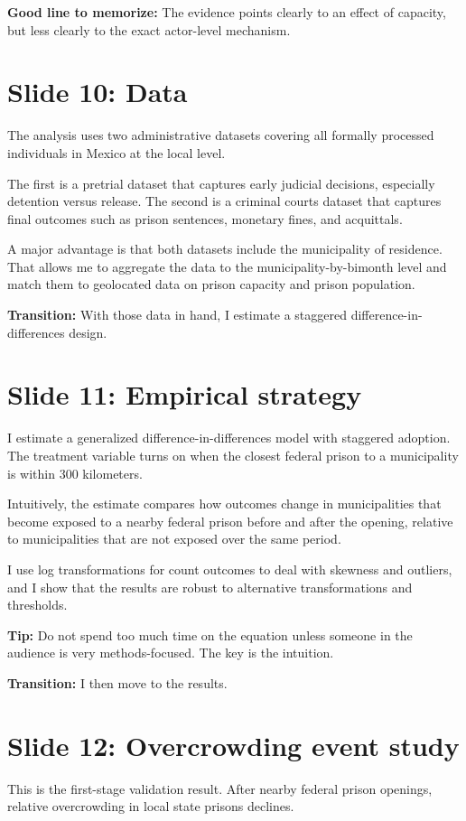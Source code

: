 \documentclass[11pt]{article}
\begin{document}
\textbf{Good line to memorize:}
The evidence points clearly to an effect of capacity, but less clearly to the exact actor-level mechanism.

\section{Slide 10: Data}
The analysis uses two administrative datasets covering all formally processed individuals in Mexico at the local level.

The first is a pretrial dataset that captures early judicial decisions, especially detention versus release. The second is a criminal courts dataset that captures final outcomes such as prison sentences, monetary fines, and acquittals.

A major advantage is that both datasets include the municipality of residence. That allows me to aggregate the data to the municipality-by-bimonth level and match them to geolocated data on prison capacity and prison population.

\textbf{Transition:} With those data in hand, I estimate a staggered difference-in-differences design.

\section{Slide 11: Empirical strategy}
I estimate a generalized difference-in-differences model with staggered adoption. The treatment variable turns on when the closest federal prison to a municipality is within 300 kilometers.

Intuitively, the estimate compares how outcomes change in municipalities that become exposed to a nearby federal prison before and after the opening, relative to municipalities that are not exposed over the same period.

I use log transformations for count outcomes to deal with skewness and outliers, and I show that the results are robust to alternative transformations and thresholds.

\textbf{Tip:}
Do not spend too much time on the equation unless someone in the audience is very methods-focused. The key is the intuition.

\textbf{Transition:} I then move to the results.

\section{Slide 12: Overcrowding event study}
This is the first-stage validation result. After nearby federal prison openings, relative overcrowding in local state prisons declines.
\end{document}
